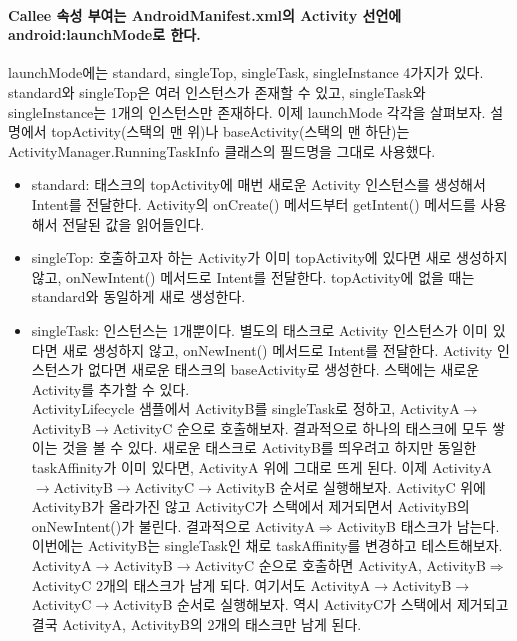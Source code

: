 \paragraph{Callee 속성 부여는 AndroidManifest.xml의 Activity 선언에 android:launchMode로 한다.}
launchMode에는 standard, singleTop, singleTask, singleInstance 4가지가 있다. standard와 singleTop은 여러 인스턴스가 존재할 수 있고, singleTask와 singleInstance는 1개의 인스턴스만 존재하다. 이제 launchMode 각각을 살펴보자. 설명에서 topActivity(스택의 맨 위)나 baseActivity(스택의 맨 하단)는  ActivityManager.RunningTaskInfo 클래스의 필드명을 그대로 사용했다.
\begin{itemize}
\item standard: 태스크의 topActivity에 매번 새로운 Activity 인스턴스를 생성해서 Intent를 전달한다. Activity의 onCreate() 메서드부터 getIntent() 메서드를 사용해서 전달된 값을 읽어들인다.

\item singleTop: 호출하고자 하는 Activity가 이미 topActivity에 있다면 새로 생성하지 않고, onNewIntent() 메서드로 Intent를 전달한다. topActivity에 없을 때는 standard와 동일하게 새로 생성한다.

\item singleTask: 인스턴스는 1개뿐이다. 별도의 태스크로 Activity 인스턴스가 이미 있다면 새로 생성하지 않고, onNewInent() 메서드로 Intent를 전달한다. 
Activity 인스턴스가 없다면 새로운 태스크의 baseActivity로 생성한다. 스택에는 새로운 Activity를 추가할 수 있다.\\

ActivityLifecycle 샘플에서 ActivityB를 singleTask로 정하고, ActivityA$\rightarrow$ActivityB$\rightarrow$ActivityC 순으로 호출해보자. 결과적으로 하나의 태스크에 모두 쌓이는 것을 볼 수 있다. 
새로운 태스크로 ActivityB를 띄우려고 하지만 동일한 taskAffinity가 이미 있다면, ActivityA 위에 그대로 뜨게 된다.
이제 ActivityA$\rightarrow$ActivityB$\rightarrow$ActivityC$\rightarrow$ActivityB 순서로 실행해보자. ActivityC 위에 ActivityB가 올라가진 않고 ActivityC가 스택에서 제거되면서 ActivityB의 onNewIntent()가 불린다. 결과적으로 ActivityA$\Rightarrow$ActivityB 태스크가 남는다.\\

이번에는 ActivityB는 singleTask인 채로 taskAffinity를 변경하고 테스트해보자. ActivityA$\rightarrow$ActivityB$\rightarrow$ActivityC 순으로 호출하면 ActivityA, ActivityB$\Rightarrow$ActivityC 2개의 태스크가 남게 되다. 
여기서도 ActivityA$\rightarrow$Activi\-tyB$\rightarrow$ActivityC$\rightarrow$ActivityB 순서로 실행해보자. 역시 ActivityC가 스택에서 제거되고 결국 ActivityA, ActivityB의 2개의 태스크만 남게 된다.\\


\end{itemize}

